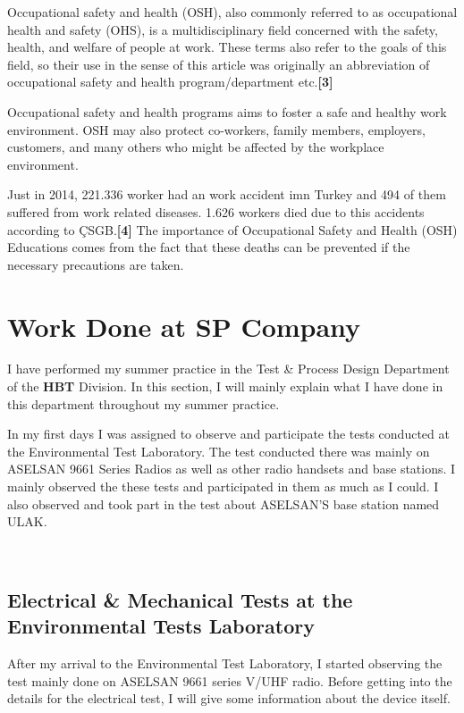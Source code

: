	Occupational safety and health (OSH), also commonly referred to as occupational health and safety (OHS), is a multidisciplinary field concerned with the safety, health, and welfare of people at work. These terms also refer to the goals of this field, so their use in the sense of this article was originally an abbreviation of occupational safety and health program/department etc.\textbf{[3]}

	Occupational safety and health programs aims to foster a safe and healthy work environment. OSH may also protect co-workers, family members, employers, customers, and many others who might be affected by the workplace environment. 

	Just in 2014, 221.336 worker had an work accident imn Turkey and 494 of them suffered from work related diseases. 1.626 workers died due to this accidents according to ÇSGB.\textbf{[4]} The importance of Occupational Safety and Health (OSH) Educations comes from the fact that these deaths can be prevented if the necessary precautions are taken.

\section{Work Done at SP Company}
\- \indent
	I have performed my summer practice in the Test \& Process Design Department of the \textbf{HBT} Division. In this section, I will mainly explain what I have done in this department throughout my summer practice.
	 
	In my first days I was assigned to observe and participate the tests conducted at the Environmental   Test Laboratory. The test conducted there was mainly on ASELSAN 9661 Series Radios as well as other radio handsets and base stations. I mainly observed the these tests and participated in them as much as I could. I also observed and took part in the test about ASELSAN'S base station named ULAK. 

\-\\

\subsection{Electrical \& Mechanical Tests at the Environmental Tests Laboratory  }
\- \indent
	After my arrival to the Environmental Test Laboratory, I started observing the test mainly done on ASELSAN 9661 series V/UHF radio. Before getting into the details for the electrical test, I will give some information about the device itself.   
	
